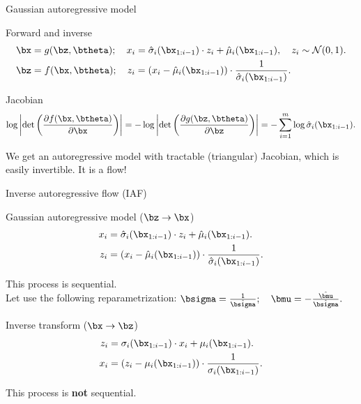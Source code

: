 \begin{frame}{Gaussian autoregressive model}
	\begin{block}{Forward and inverse}
		\vspace{-0.3cm}
		\begin{align*}
			\bx &= g(\bz, \btheta); \quad x_i = \hat{\sigma}_i (\bx_{1:i-1}) \cdot z_i + \hat{\mu}_i(\bx_{1:i-1}), \quad z_i \sim \mathcal{N}(0, 1). \\
			\bz &= f(\bx, \btheta); \quad z_i = \left(x_i - \hat{\mu}_i(\bx_{1:i-1}) \right) \cdot \frac{1}{\hat{\sigma}_i (\bx_{1:i-1}) }.
		\end{align*}
	\vspace{-0.3cm}
	\end{block}
	\begin{block}{Jacobian}
		\vspace{-0.3cm}
		\[
		\log \left|\det \left( \frac{\partial f(\bx, \btheta)}{\partial \bx} \right) \right| = -\log \left|\det \left( \frac{\partial g(\bz, \btheta)}{\partial \bz} \right) \right| = - \sum_{i = 1}^m \log \hat{\sigma}_i (\bx_{1:i-1}).
		\]
		\vspace{-0.3cm}
	\end{block} 
	We get an autoregressive model with tractable (triangular) Jacobian, which is easily invertible. It is a flow!
\end{frame}
\begin{frame}{Inverse autoregressive flow (IAF)}
	
	\begin{block}{Gaussian autoregressive model ($\bz \rightarrow \bx$)}
		\vspace{-0.5cm}
		\begin{align*}
		x_i &= \hat{\sigma}_i (\bx_{1:i-1}) \cdot z_i + \hat{\mu}_i(\bx_{1:i-1}).\\
		z_i &= \left(x_i - \hat{\mu}_i(\bx_{1:i-1}) \right) \cdot \frac{1}{ \hat{\sigma}_i (\bx_{1:i-1})}.
		\end{align*}
		\vspace{-0.5cm}
	\end{block}
	This process is sequential. \\
	Let use the following reparametrization:
	$\bsigma = \frac{1}{\hat{\bsigma}}; \quad \bmu = - \frac{\hat{\bmu}}{\hat{\bsigma}}.$
	
	\begin{block}{Inverse transform ($\bx \rightarrow \bz$)}
		\vspace{-0.3cm}
		\begin{align*}
		z_i &= \sigma_i (\bx_{1:i-1}) \cdot x_i + \mu_i(\bx_{1:i-1}). \\
		x_i &= \left( z_i - \mu_i(\bx_{1:i-1})\right) \cdot \frac{1}{\sigma_i (\bx_{1:i-1}) }.
		\end{align*}
		\vspace{-0.3cm}
	\end{block}
	This process is \textbf{not} sequential.

\end{frame}
